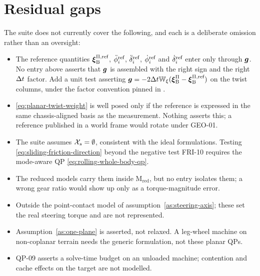 \documentclass[10pt]{article}
\newcommand{\wheelAngle}{\phi}
\begin{document}
\section{Residual gaps}
\label{sec:test-gaps}

The suite does not currently cover the following, and each is a deliberate
omission rather than an oversight:
\begin{itemize}
  \item {} The reference quantities
    $\boldsymbol{\xi}^{\Pi,\text{ref}}_{\text{B}}$,
    $\reff{\ddot{\wheelAngle}}_i$, $\ddot\delta^{\text{ref}}_i$,
    $\reff{\dot{\wheelAngle}}_i$ and $\dot\delta^{\text{ref}}_i$ enter only through
    $\boldsymbol{g}$. No entry above asserts that $\boldsymbol{g}$ is assembled with the right
    sign and the right $\Delta t$ factor. Add a unit test asserting
    $\boldsymbol{g}=-2\Delta t\mathbb{W}_{\xi}
    (\boldsymbol{\xi}^{\Pi}_{\text{B}}-\boldsymbol{\xi}^{\Pi,\text{ref}}_{\text{B}})$ on the
    twist columns, under the factor convention pinned in
    .
  \item {}
    \eqref{eq:planar-twist-weight} is well posed only if the reference is
    expressed in the same chassis-aligned basis as the measurement. Nothing
    asserts this; a reference published in a world frame would rotate under
    GEO-01.
  \item {} The suite assumes
    $\mathcal{X}_{s}=\emptyset$, consistent with the ideal formulations. Testing
    \eqref{eq:sliding-friction-direction} beyond the negative test FRI-10
    requires the mode-aware QP \eqref{eq:rolling-whole-body-qp}.
  \item {} The reduced models carry
    them inside $\text{M}_{\text{red}}$, but no entry isolates them; a wrong
    gear ratio would show up only as a torque-magnitude error.
  \item {} Outside the
    point-contact model of assumption~\ref{as:steering-axis}; these set the
    real steering torque and are not represented.
  \item {} Assumption~\ref{as:one-plane} is
    asserted, not relaxed. A leg-wheel machine on non-coplanar terrain needs
    the generic formulation, not these planar QPs.
  \item {} QP-09 asserts a solve-time budget on an
    unloaded machine; contention and cache effects on the target are not
    modelled.
\end{itemize}



\end{document}
